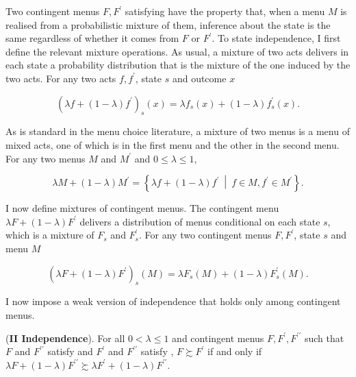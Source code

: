 Two contingent menus \( F, F^{\prime} \) satisfying  have the property that, when a menu \( M \) is realised from a probabilistic mixture of them, inference about the state is the same regardless of whether it comes from \( F \) or \( F^{\prime} \). To state independence, I first define the relevant mixture operations. As usual, a mixture of two acts delivers in each state a probability distribution that is the mixture of the one induced by the two acts. For any two acts \( f,f^{\prime} \), state \( s \) and outcome \( x \)

\[ \left( \lambda f + \left( 1 - \lambda \right) f^{\prime} \right)_s \left( x \right) = \lambda f_s \left( x \right) + \left( 1 - \lambda \right) f^{\prime}_s \left( x \right) . \]

As is standard in the menu choice literature, a mixture of two menus is a menu of mixed acts, one of which is in the first menu and the other in the second menu. For any two menus \( M \) and \( M^{\prime} \) and \( 0 \leq \lambda \leq 1 \),

\[
	\lambda M + \left( 1 - \lambda \right) M^{\prime} = \left\{ \lambda f + \left( 1 - \lambda \right) f^{\prime} \: \middle\vert  \: f \in M, f^{\prime} \in M^{\prime} \right\} .
\]

I now define mixtures of contingent menus. The contingent menu \( \lambda F + \left( 1- \lambda \right) F^{\prime} \) delivers a distribution of menus conditional on each state \( s \), which is a mixture of \( F_{s} \) and \( F^{\prime}_{s} \). For any two contingent menus \( F, F^{\prime} \), state \( s \) and menu \( M \)

\[
	\left( \lambda F + \left( 1- \lambda \right) F^{\prime} \right)_{s} \left( M \right) = \lambda F_{s} \left( M \right) + \left( 1- \lambda \right) F^{\prime}_{s} \left( M \right) .
\]

I now impose a weak version of independence that holds only among  contingent menus.

\begin{axiom}\label{ax:independence}

	(\textbf{II Independence}). For all \(0<\lambda \leq 1\) and contingent menus \(F, F^{\prime}, F^{\prime \prime} \) such that \(F\) and \(F^{\prime \prime}\) satisfy  and \(F^{\prime}\) and \(F^{\prime \prime}\) satisfy , \(F \succsim F^{\prime}\) if and only if \(\lambda F+ \left( 1-\lambda \right) F^{\prime \prime} \succsim \lambda F^{\prime} + \left( 1-\lambda \right) F^{\prime \prime}\).

\end{axiom}

